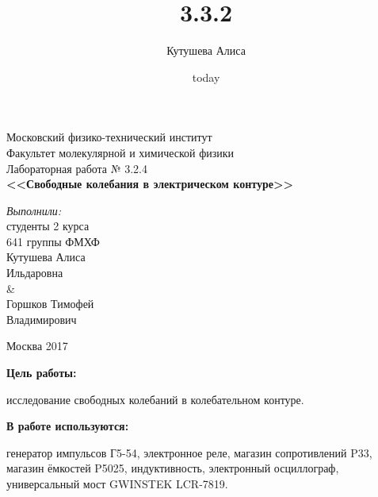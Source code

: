 \documentclass[a4paper,12pt]{article}
\title{3.3.2}
\author{Кутушева Алиса}
\date{today}
\begin{document}
	
	\begin{titlepage}
		\begin{center} 
			
			\large Московский физико-технический институт\\
			Факультет молекулярной и химической физики\\
			\vspace{7cm}
			\huge Лабораторная работа № 3.2.4\\
			\textbf{\Large <<Свободные колебания в электрическом контуре>>}\\
		\end{center} 
		
		\vspace{7.5cm}
		{\par \raggedleft \large \emph{Выполнили:}\\ студенты 2 курса\\ 641 группы ФМХФ\\ Кутушева Алиса\\ Ильдаровна \\ \& \\Горшков Тимофей \\Владимирович \par}
		\begin{center}
			\vfill Москва 2017
		\end{center}
	\end{titlepage}
\newpage
\setcounter{page}{2}

\begin{center}
\end{center}

	\hspace{0.2cm}\textbf{Цель работы:}
	\par исследование свободных колебаний в колебательном контуре.


	\hspace{0.2cm}\textbf{В работе используются:}
	\par генератор импульсов Г5-54, электронное реле, магазин сопротивлений P33, магазин ёмкостей P5025, индуктивность, электронный осциллограф, универсальный мост GWINSTEK LCR-7819.
	
\end{document}
